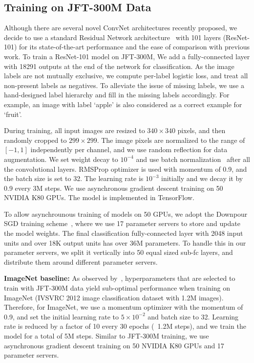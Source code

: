 \documentclass[10pt,twocolumn,letterpaper]{article}
\begin{document}
\subsection{Training on JFT-300M Data} \label{sec:jft_train_setup}
Although there are several novel ConvNet architectures recently proposed, we decide to use a standard Residual Network architecture~\cite{he2016resnet} with 101 layers (ResNet-101) for its state-of-the-art performance and the ease of comparison with previous work. To train a ResNet-101 model on JFT-300M, We add a fully-connected layer with 18291 outputs at the end of the network for classification. As the image labels are not mutually exclusive, we compute per-label logistic loss, and treat all non-present labels as negatives. To alleviate the issue of missing labels, we use a hand-designed label hierarchy and fill in the missing labels accordingly. For example, an image with label `apple' is also considered as a correct example for `fruit'.

During training, all input images are resized to $340\times 340$ pixels, and then randomly cropped to $299\times 299$. The image pixels are normalized to the range of $[-1, 1]$ independently per channel, and we use random reflection for data augmentation. We set weight decay to $10^{-4}$ and use batch normalization~\cite{BatchNorm} after all the convolutional layers. RMSProp optimizer is used with momentum of 0.9, and the batch size is set to 32. The learning rate is $10^{-3}$ initially and we decay it by 0.9 every 3M steps. We use asynchronous gradient descent training on 50 NVIDIA K80 GPUs. The model is implemented in TensorFlow.

To allow asynchrounous training of models on 50 GPUs, we adopt the Downpour SGD training scheme~\cite{DeanAsyncTraining}, where we use 17 parameter servers to store and update the model weights. 
The final classification fully-connected layer with 2048 input units and over 18K output units has over 36M parameters. To handle this in our parameter servers, we split it vertically into 50 equal sized sub-fc layers, and distribute them around different parameter servers.

\textbf{ImageNet baseline:} As observed by~\cite{Chollet}, hyperparameters that are selected to train with JFT-300M data yield sub-optimal performance when training on ImageNet (IVSVRC 2012 image classification dataset with 1.2M images). Therefore, for ImageNet, we use a momentum optimizer with the momentum of 0.9, and set the initial learning rate to $5\times 10^{-2}$ and batch size to 32. Learning rate is reduced by a factor of 10 every 30 epochs (~1.2M steps), and we train the model for a total of 5M steps. Similar to JFT-300M training, we use asynchronous gradient descent training on 50 NVIDIA K80 GPUs and 17 parameter servers. 
\end{document}
